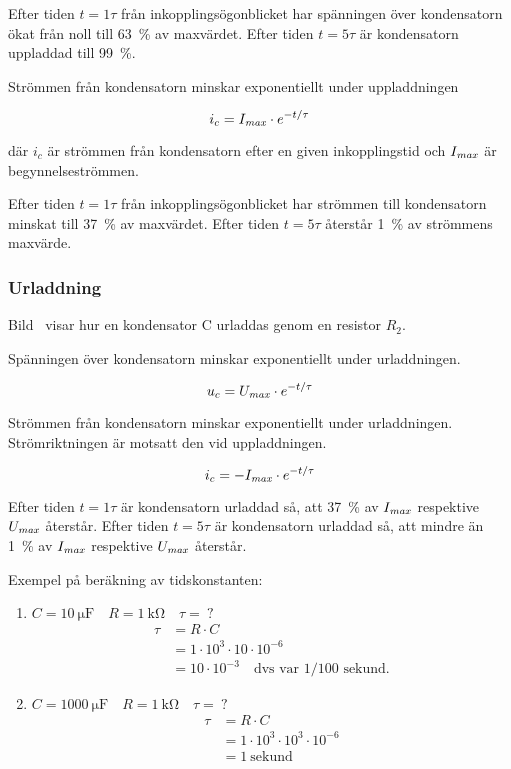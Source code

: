 Efter tiden \(t = 1\tau\) från inkopplingsögonblicket har spänningen över
kondensatorn ökat från noll till \qty{63}{\percent} av maxvärdet.
Efter tiden \(t = 5\tau\) är kondensatorn uppladdad till \qty{99}{\percent}.

Strömmen från kondensatorn minskar exponentiellt under uppladdningen

\[i_c = I_{\it max} \cdot e^{-t/\tau}\]

där
\(i_c\) är strömmen från kondensatorn efter en given inkopplingstid och 
\(I_{\it max}\) är begynnelseströmmen.

Efter tiden \(t = 1\tau\) från inkopplingsögonblicket har strömmen till
kondensatorn minskat till \qty{37}{\percent} av maxvärdet.
Efter tiden \(t = 5\tau\) återstår \qty{1}{\percent} av strömmens maxvärde.

\subsubsection{Urladdning}


Bild~ visar hur en kondensator C urladdas genom en
resistor \(R_2\).

Spänningen över kondensatorn minskar exponentiellt under urladdningen.

\[u_c = U_{\it max} \cdot e^{-t/\tau}\]

Strömmen från kondensatorn minskar exponentiellt under urladdningen.
Strömriktningen är motsatt den vid uppladdningen.

\[i_c = - I_{\it max} \cdot e^{-t/\tau}\]

Efter tiden \(t = 1\tau\) är kondensatorn urladdad så, att \qty{37}{\percent} av
\(I_{\it max}\) respektive \(U_{\it max}\) återstår.
Efter tiden \(t = 5\tau\) är kondensatorn urladdad så, att mindre än
\qty{1}{\percent} av \(I_{\it max}\) respektive \(U_{\it max}\) återstår.

Exempel på beräkning av tidskonstanten:
\begin{enumerate}
\item \(C = \qty{10}{\micro\farad} \quad R = \qty{1}{\kilo\ohm} \quad \tau =\ ?\)
  \begin{align*}
    \tau &= R \cdot C \\
    &= 1 \cdot 10^3 \cdot 10 \cdot 10^{-6} \\
    &= 10 \cdot 10^{-3} \quad \text{dvs var 1/100 sekund.}
  \end{align*}
\item \(C = \qty{1000}{\micro\farad} \quad R = \qty{1}{\kilo\ohm} \quad \tau =\ ?\)
  \begin{align*}
    \tau &= R \cdot C \\
    &= 1 \cdot 10^3 \cdot 10^3 \cdot 10^{-6} \\
    &= 1\ \text{sekund}
  \end{align*}
\end{enumerate}


